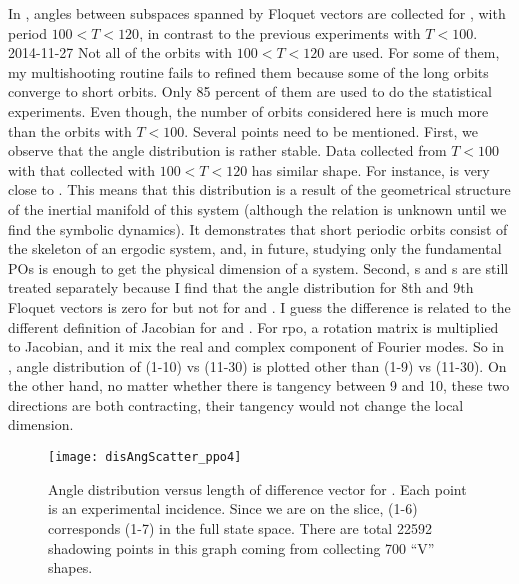 \begin{description}
In 
, angles between subspaces spanned by
Floquet vectors are collected for ,  with
period $ 100 < T < 120$, in contrast to the previous experiments
with $T < 100$.
\Xiong
{2014-11-27}
{Not all of the orbits with $100 < T < 120$ are used. For some
of them, my multishooting routine fails to refined them because some
of the long orbits converge to short orbits. Only 85 percent of them
are used to do the statistical experiments. Even though, the number
of orbits considered here is much more than the orbits with $T < 100$.}
Several points need to be mentioned.
First, we observe that the angle distribution is
rather stable. Data collected from $T < 100$ with that
collected with $100 < T < 120$ has similar shape. For instance,
 is very close to
. This means that this
distribution is a result of the geometrical structure of the
inertial manifold of this system (although the relation is unknown
until we find the symbolic dynamics).
It demonstrates that  short periodic orbits consist
of the skeleton of an ergodic system, and, in future,
studying only the fundamental POs is enough  to get the physical dimension of
a system. Second, s and s are still treated
separately because I find that the angle distribution for 8th and 9th Floquet
vectors is zero for  but not for 
 and .
I guess the difference is related to the different definition of Jacobian
for  and . For rpo, a rotation matrix is multiplied
to Jacobian, and it mix the real and complex component of Fourier modes.
So in , angle distribution of (1-10) vs (11-30) is
plotted other than (1-9) vs (11-30). On the other hand, no matter whether
there is tangency between 9 and 10, these two directions are both
contracting, their tangency would not change the local dimension.

\begin{figure}[h]
  \centering
  \texttt{[image: disAngScatter\_ppo4]}
  \caption{Angle distribution versus length of difference vector for
    . Each point
    is an experimental incidence. Since we are on the slice, (1-6) corresponds
    (1-7) in the full state space. There are total 22592 shadowing points in
    this graph coming from collecting 700 ``V'' shapes.
  }
  \label{fig:disAngScatter_ppo4}
\end{figure}


\end{description}
